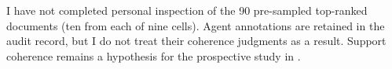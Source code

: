 I have not completed personal inspection of the 90 pre-sampled top-ranked
documents (ten from each of nine cells). Agent annotations are retained in
the audit record, but I do not treat their coherence judgments as a result.
Support coherence remains a hypothesis for the prospective study in
.
